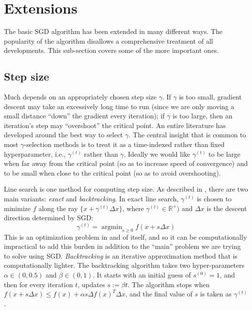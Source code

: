 \documentclass{report}
\DeclareMathOperator*{\argmin}{argmin}
\begin{document}
\section{Extensions}

The basic SGD algorithm has been extended in many different ways. The popularity of
the algorithm disallows a comprehensive treatment of all
developments. This sub-section covers some of the more important
ones.


\subsection{Step size}

Much depends on
an appropriately chosen step size $\gamma$. If $\gamma$ is too small, gradient
descent may
take an excessively long time to run (since we are only moving a small distance
``down'' the gradient every iteration); if $\gamma$ is too large, then an
iteration's step may ``overshoot'' the critical point.
An entire literature has developed around the best way to select $\gamma$. The
central insight that is common to most $\gamma$-selection methods is to treat it
as a time-indexed rather than fixed hyperparameter, i.e., $\gamma^{(t)}$ rather
than $\gamma$. Ideally we would like $\gamma^{(t)}$ to be large when far away
from the critical point (so as to increase speed of convergence) and to be small
when close to the critical point (so as to avoid overshooting).

Line search is one method for computing step size. As described in
\cite{boyd2004convex}, there are two main variants: \textit{exact} and
\textit{backtracking}. In exact line search, $\gamma^{(t)}$ is chosen to minimize $f$
along the ray $\{x + \gamma^{(t)} \Delta x\}$, where $\gamma^{(t)} \in \mathbb{R}^+)$ and
$\Delta x$ is the descent direction determined by SGD:
\begin{equation}
	\gamma^{(t)} = \argmin_{s \geq 0} f(x + s\Delta x)
\end{equation}
This is an optimization problem in and of itself, and
so it can be computationally impractical to add this burden in addition to the
``main'' problem we are trying to solve using SGD. \textit{Backtracking} is an iterative approximation method that is
computationally lighter. The backtracking algorithm takes two hyper-parameters
$\alpha \in (0, 0.5)$ and $\beta \in (0, 1)$. It starts with an initial guess of
$s^{(0)} = 1$, and then for every iteration $t$, updates $s := \beta t$. The
algorithm stops when $f(x + s \Delta x) \leq f(x) + \alpha s \Delta f(x)^T
\Delta x$, and the final value of $s$ is taken as $\gamma^{(t)}$. 
\end{document}
